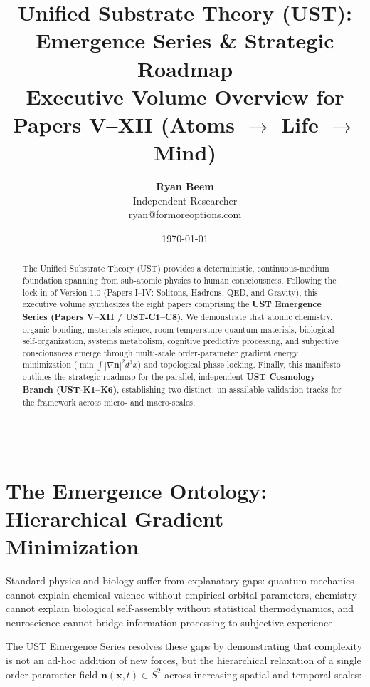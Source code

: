\documentclass[11pt,a4paper]{article}
\title{\Large\bfseries Unified Substrate Theory (UST):\\Emergence Series \& Strategic Roadmap\\[0.3em]
	\large Executive Volume Overview for Papers V--XII (Atoms $\to$ Life $\to$ Mind)}
\author{
	\textbf{Ryan Beem}\\[0.5em]
	\small Independent Researcher \\
	\small \href{mailto:ryan@formoreoptions.com}{ryan@formoreoptions.com}
}
\date{\today}
\begin{document}
	
	\maketitle
	
	\begin{abstract}
		The Unified Substrate Theory (UST) provides a deterministic, continuous-medium foundation spanning from sub-atomic physics to human consciousness. Following the lock-in of Version 1.0 (Papers I--IV: Solitons, Hadrons, QED, and Gravity), this executive volume synthesizes the eight papers comprising the \textbf{UST Emergence Series (Papers V--XII / UST-C1--C8)}. We demonstrate that atomic chemistry, organic bonding, materials science, room-temperature quantum materials, biological self-organization, systems metabolism, cognitive predictive processing, and subjective consciousness emerge through multi-scale order-parameter gradient energy minimization ($\min \int |\nabla \mathbf{n}|^2 d^3x$) and topological phase locking. Finally, this manifesto outlines the strategic roadmap for the parallel, independent \textbf{UST Cosmology Branch (UST-K1--K6)}, establishing two distinct, un-assailable validation tracks for the framework across micro- and macro-scales.
	\end{abstract}
	
	\vspace{1em}
	\hrule
	\vspace{1.5em}
	
	\section{The Emergence Ontology: Hierarchical Gradient Minimization}
	\label{sec:emergence_ontology}
	
	Standard physics and biology suffer from explanatory gaps: quantum mechanics cannot explain chemical valence without empirical orbital parameters, chemistry cannot explain biological self-assembly without statistical thermodynamics, and neuroscience cannot bridge information processing to subjective experience.
	
	The UST Emergence Series resolves these gaps by demonstrating that complexity is not an ad-hoc addition of new forces, but the hierarchical relaxation of a single order-parameter field $\mathbf{n}(\mathbf{x}, t) \in S^2$ across increasing spatial and temporal scales:
	
\end{document}
